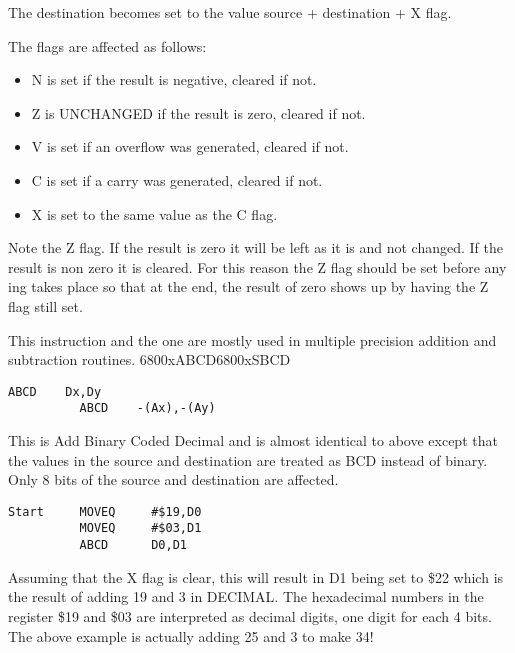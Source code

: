 The destination becomes set to the value source + destination + X
      flag.

The flags are affected as follows:
\begin{itemize}[itemsep=0pt]

\item{}N is set if the result is negative, cleared if not.


\item{}Z is UNCHANGED if the result is zero, cleared if not.


\item{}V is set if an overflow was generated, cleared if not.


\item{}C is set if a carry was generated, cleared if not.


\item{}X is set to the same value as the C flag.

\end{itemize}

Note the Z flag. If the result is zero it will be left as it is
      and not changed. If the result is non zero it is cleared. For this
      reason the Z flag should be set before any ing takes place so that
      at the end, the result of zero shows up by having the Z flag still
      set.

This instruction and the  one are mostly used in multiple
      precision addition and subtraction routines.
\mc6800x{ABCD}\mc6800x{SBCD}
\begin{lstlisting}[firstnumber=1,]
          ABCD    Dx,Dy
          ABCD    -(Ax),-(Ay)
\end{lstlisting}

This is Add Binary Coded Decimal and is almost identical to 
      above except that the values in the source and destination are treated
      as BCD instead of binary. Only 8 bits of the source and destination are
      affected.

\begin{lstlisting}[firstnumber=1,caption={ABCD Example}]
Start     MOVEQ     #$19,D0
          MOVEQ     #$03,D1
          ABCD      D0,D1
\end{lstlisting}

Assuming that the X flag is clear, this will result in D1 being
      set to \$22 which is the result of adding 19 and 3 in DECIMAL. The
      hexadecimal numbers in the register \$19 and \$03 are interpreted as
      decimal digits, one digit for each 4 bits. The above example is actually
      adding 25 and 3 to make 34!

